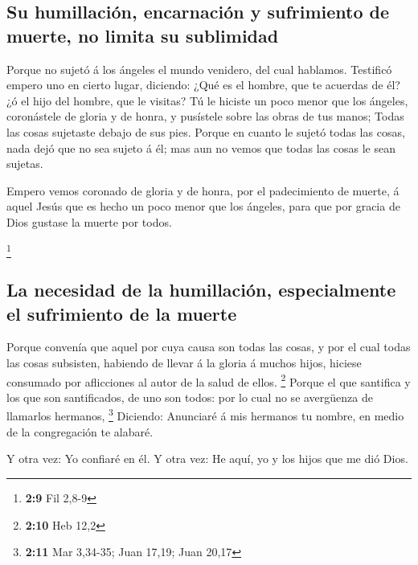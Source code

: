 \hypertarget{su-humillaciuxf3n-encarnaciuxf3n-y-sufrimiento-de-muerte-no-limita-su-sublimidad}{%
\subsection{Su humillación, encarnación y sufrimiento de muerte, no
limita su
sublimidad}\label{su-humillaciuxf3n-encarnaciuxf3n-y-sufrimiento-de-muerte-no-limita-su-sublimidad}}

 Porque no sujetó á los ángeles el mundo venidero, del
cual hablamos.  Testificó empero uno en cierto lugar,
diciendo: ¿Qué es el hombre, que te acuerdas de él? ¿ó el hijo del
hombre, que le visitas?  Tú le hiciste un poco menor que
los ángeles, coronástele de gloria y de honra, y pusístele sobre las
obras de tus manos;  Todas las cosas sujetaste debajo de
sus pies. Porque en cuanto le sujetó todas las cosas, nada dejó que no
sea sujeto á él; mas aun no vemos que todas las cosas le sean sujetas.

 Empero vemos coronado de gloria y de honra, por el
padecimiento de muerte, á aquel Jesús que es hecho un poco menor que los
ángeles, para que por gracia de Dios gustase la muerte por todos.

\footnote{\textbf{2:9} Fil 2,8-9}

\hypertarget{la-necesidad-de-la-humillaciuxf3n-especialmente-el-sufrimiento-de-la-muerte}{%
\subsection{La necesidad de la humillación, especialmente el sufrimiento
de la
muerte}\label{la-necesidad-de-la-humillaciuxf3n-especialmente-el-sufrimiento-de-la-muerte}}

 Porque convenía que aquel por cuya causa son todas las
cosas, y por el cual todas las cosas subsisten, habiendo de llevar á la
gloria á muchos hijos, hiciese consumado por aflicciones al autor de la
salud de ellos. \footnote{\textbf{2:10} Heb 12,2}  Porque
el que santifica y los que son santificados, de uno son todos: por lo
cual no se avergüenza de llamarlos hermanos, \footnote{\textbf{2:11} Mar
  3,34-35; Juan 17,19; Juan 20,17}  Diciendo: Anunciaré á
mis hermanos tu nombre, en medio de la congregación te alabaré.

 Y otra vez: Yo confiaré en él. Y otra vez: He aquí, yo y
los hijos que me dió Dios.

